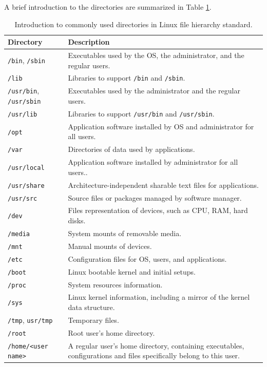 A brief introduction to the directories are summarized in Table \ref{ch4tab:hierarchyintro}.

\begin{table}
  \centering \caption{Introduction to commonly used directories in Linux file hierarchy standard.}\label{ch4tab:hierarchyintro}
  \begin{tabularx}{\textwidth}{lX}
    \hline
    Directory & Description \\ \hline
    \verb|/bin|, \verb|/sbin| & Executables used by the OS, the administrator, and the regular users. \\ \hdashline
    \verb|/lib| & Libraries to support \verb|/bin| and \verb|/sbin|. \\ \hdashline
    \verb|/usr/bin|, \verb|/usr/sbin| & Executables used by the administrator and the regular users. \\ \hdashline
    \verb|/usr/lib| & Libraries to support \verb|/usr/bin| and \verb|/usr/sbin|. \\ \hdashline
    \verb|/opt| & Application software installed by OS and administrator for all users. \\ \hdashline
    \verb|/var| & Directories of data used by applications. \\ \hdashline
    \verb|/usr/local| & Application software installed by administrator for all users.. \\ \hdashline
    \verb|/usr/share| & Architecture-independent sharable text files for applications. \\ \hdashline
    \verb|/usr/src| & Source files or packages managed by software manager. \\ \hdashline
    \verb|/dev| & Files representation of devices, such as CPU, RAM, hard disks. \\ \hdashline
    \verb|/media| & System mounts of removable media. \\ \hdashline
    \verb|/mnt| & Manual mounts of devices. \\ \hdashline
    \verb|/etc| & Configuration files for OS, users, and applications. \\ \hdashline
    \verb|/boot| & Linux bootable kernel and initial setups. \\ \hdashline
    \verb|/proc| & System resources information. \\ \hdashline
    \verb|/sys| & Linux kernel information, including a mirror of the kernel data structure. \\ \hdashline
    \verb|/tmp|, \verb|usr/tmp| & Temporary files. \\ \hdashline
    \verb|/root| & Root user's home directory. \\ \hdashline
    \verb|/home/<user name>| & A regular user's home directory, containing executables, configurations and files specifically belong to this user. \\
    \hline
  \end{tabularx}
\end{table}

